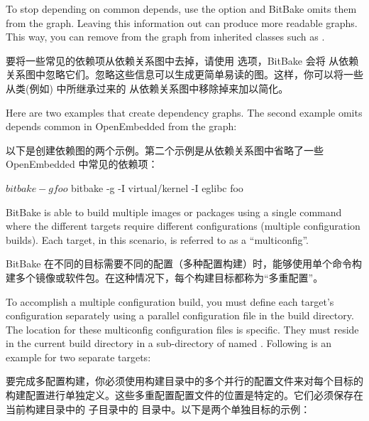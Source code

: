 To stop depending on common depends, use the  option and BitBake omits them from the graph. Leaving this information out can produce more readable graphs. This way, you can remove from the graph  from inherited classes such as .

要将一些常见的依赖项从依赖关系图中去掉，请使用  选项，BitBake 会将  从依赖关系图中忽略它们。忽略这些信息可以生成更简单易读的图。这样，你可以将一些从类(例如) 中所继承过来的  从依赖关系图中移除掉来加以简化。

Here are two examples that create dependency graphs. The second example omits depends common in OpenEmbedded from the graph:

以下是创建依赖图的两个示例。第二个示例是从依赖关系图中省略了一些 OpenEmbedded 中常见的依赖项：

\begin{pyglist}
$ bitbake -g foo

$ bitbake -g -I virtual/kernel -I eglibc foo
\end{pyglist}

\label{section:Executing a Multiple Configuration Build}

BitBake is able to build multiple images or packages using a single command where the different targets require different configurations (multiple configuration builds). Each target, in this scenario, is referred to as a ``multiconfig''.

BitBake 在不同的目标需要不同的配置（多种配置构建）时，能够使用单个命令构建多个镜像或软件包。在这种情况下，每个构建目标都称为“多重配置”。

To accomplish a multiple configuration build, you must define each target's configuration separately using a parallel configuration file in the build directory. The location for these multiconfig configuration files is specific. They must reside in the current build directory in a sub-directory of  named . Following is an example for two separate targets:

要完成多配置构建，你必须使用构建目录中的多个并行的配置文件来对每个目标的构建配置进行单独定义。这些多重配置配置文件的位置是特定的。它们必须保存在当前构建目录中的  子目录中的  目录中。以下是两个单独目标的示例：

